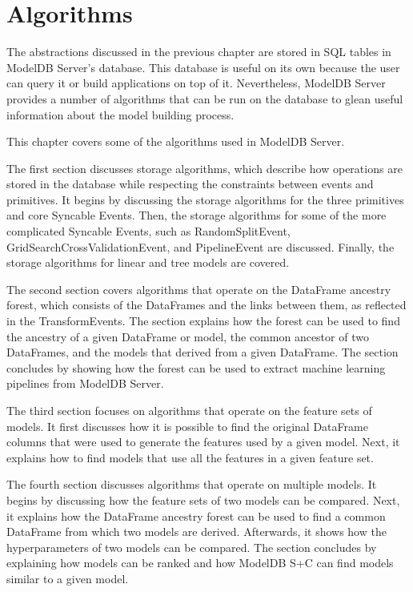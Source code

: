 \chapter{Algorithms}
The abstractions discussed in the previous chapter are stored in SQL tables in
ModelDB Server's database. This database is useful on its own because the user can
query it or build applications on top of it. Nevertheless, ModelDB Server provides
a number of algorithms that can be run on the database to glean useful information
about the model building process.

This chapter covers some of the algorithms used in ModelDB Server. 

The first section discusses storage algorithms, which describe how operations are stored in the database while
respecting the constraints between events and primitives. It begins by discussing the
storage algorithms for the three primitives and core
Syncable Events. Then, the storage algorithms for some
of the more complicated Syncable Events, such as RandomSplitEvent, GridSearchCrossValidationEvent,
and PipelineEvent are discussed. Finally, the storage algorithms for linear and tree models are
covered.

The second section covers algorithms that operate on the DataFrame ancestry forest, which consists
of the DataFrames and the links between them, as reflected in the TransformEvents. The section explains
how the forest can be used to find the ancestry of a given DataFrame or model, the common ancestor of two
DataFrames, and the models that derived from a given DataFrame. The section concludes by showing how the
forest can be used to extract machine learning pipelines from ModelDB Server.

The third section focuses on algorithms that operate on the feature sets of models. It first discusses how
it is possible to find the original DataFrame columns that were used to generate the features used by a given model.
Next, it explains how to find models that use all the features in a given feature set. 

The fourth section discusses algorithms that operate on multiple models. It begins by
discussing how the feature sets of two models can be compared. Next, it explains
how the DataFrame ancestry forest can be used to find a common DataFrame from
which two models are derived. Afterwards, it shows how the hyperparameters of two
models can be compared. The section concludes by explaining how models can be ranked
and how ModelDB S+C can find models similar to a given model.

